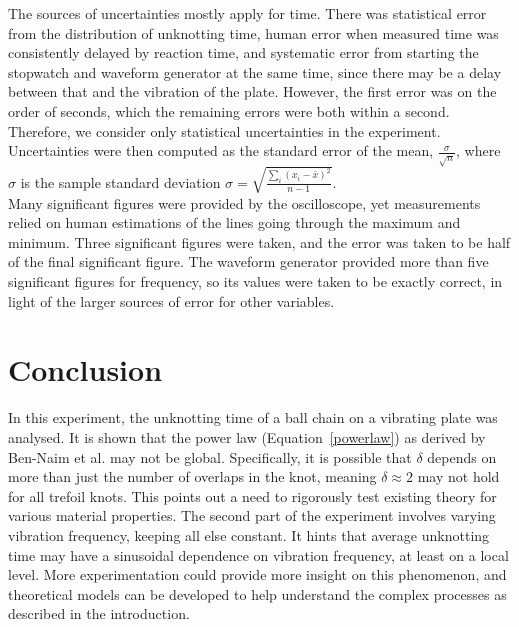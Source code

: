 \documentclass[12pt]{IEEEtran}
\begin{document}
The sources of uncertainties mostly apply for time. There was statistical error from the distribution of unknotting time, human error when measured time was consistently delayed by reaction time, and systematic error from starting the stopwatch and waveform generator at the same time, since there may be a delay between that and the vibration of the plate. However, the first error was on the order of seconds, which the remaining errors were both within a second. Therefore, we consider only statistical uncertainties in the experiment. Uncertainties were then computed as the standard error of the mean, $\frac{\sigma}{\sqrt{n}}$, where $\sigma$ is the sample standard deviation $\sigma = \sqrt{\frac{\sum_i (x_i - \bar x)^2}{n-1}}$. \\
Many significant figures were provided by the oscilloscope, yet measurements relied on human estimations of the lines going through the maximum and minimum. Three significant figures were taken, and the error was taken to be half of the final significant figure. The waveform generator provided more than five significant figures for frequency, so its values were taken to be exactly correct, in light of the larger sources of error for other variables.

\section{Conclusion}

In this experiment, the unknotting time of a ball chain on a vibrating plate was analysed. It is shown that the power law (Equation~\ref{powerlaw}) as derived by Ben-Naim et al. may not be global. Specifically, it is possible that $\delta$ depends on more than just the number of overlaps in the knot, meaning $\delta \approx 2$ may not hold for all trefoil knots. This points out a need to rigorously test existing theory for various material properties. The second part of the experiment involves varying vibration frequency, keeping all else constant. It hints that average unknotting time may have a sinusoidal dependence on vibration frequency, at least on a local level. More experimentation could provide more insight on this phenomenon, and theoretical models can be developed to help understand the complex processes as described in the introduction.

{}

\end{document}
